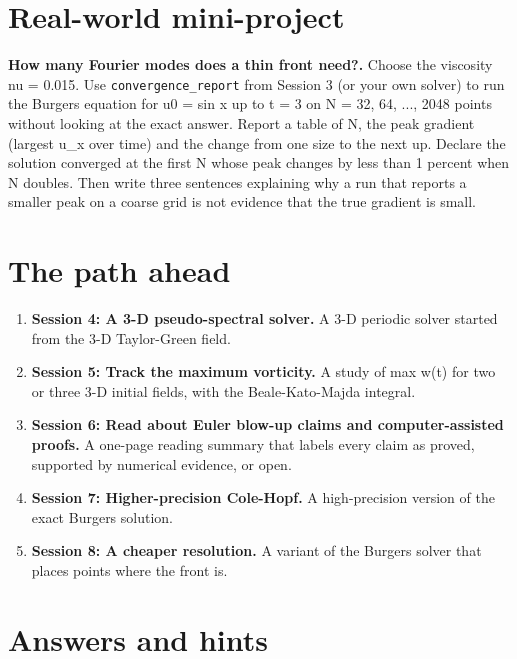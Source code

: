 \documentclass[11pt,a4paper]{article}
\begin{document}
\section{Real-world mini-project}
\textbf{How many Fourier modes does a thin front need?.} Choose the viscosity nu = 0.015. Use \texttt{convergence\_report} from Session 3 (or your own solver) to run the Burgers equation for u0 = sin x up to t = 3 on N = 32, 64, ..., 2048 points without looking at the exact answer. Report a table of N, the peak gradient (largest \textbar{}u\_x\textbar{} over time) and the change from one size to the next up. Declare the solution converged at the first N whose peak changes by less than 1 percent when N doubles. Then write three sentences explaining why a run that reports a smaller peak on a coarse grid is not evidence that the true gradient is small.

\section{The path ahead}
\begin{enumerate}[nosep]
\item \textbf{Session 4: A 3-D pseudo-spectral solver.} A 3-D periodic solver started from the 3-D Taylor-Green field.
\item \textbf{Session 5: Track the maximum vorticity.} A study of max \textbar{}w\textbar{}(t) for two or three 3-D initial fields, with the Beale-Kato-Majda integral.
\item \textbf{Session 6: Read about Euler blow-up claims and computer-assisted proofs.} A one-page reading summary that labels every claim as proved, supported by numerical evidence, or open.
\item \textbf{Session 7: Higher-precision Cole-Hopf.} A high-precision version of the exact Burgers solution.
\item \textbf{Session 8: A cheaper resolution.} A variant of the Burgers solver that places points where the front is.
\end{enumerate}

\section{Answers and hints}
\end{document}
